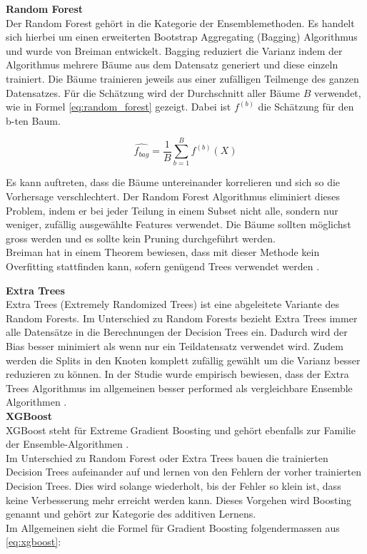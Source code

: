 \textbf{Random Forest}\\
Der Random Forest gehört in die Kategorie der Ensemblemethoden. Es handelt sich hierbei um einen erweiterten Bootstrap Aggregating (Bagging) Algorithmus und wurde von Breiman entwickelt. Bagging reduziert die Varianz indem der Algorithmus mehrere Bäume aus dem Datensatz generiert und diese einzeln trainiert.  Die Bäume trainieren jeweils aus einer zufälligen Teilmenge des ganzen Datensatzes. Für die Schätzung wird der Durchschnitt aller Bäume $B$ verwendet, wie in Formel \eqref{eq:random_forest} gezeigt. Dabei ist $f^{(b)}$ die Schätzung für den b-ten Baum.

\begin{equation}
\label{eq:random_forest}
\hat{f_{bag}} = \frac{1}{B} \sum_{b=1}^{B} f^{(b)} (X)
\end{equation}

Es kann auftreten, dass die Bäume untereinander korrelieren und sich so die Vorhersage verschlechtert. Der Random Forest Algorithmus eliminiert dieses Problem, indem er bei jeder Teilung in einem Subset nicht alle, sondern nur weniger, zufällig ausgewählte Features verwendet. Die Bäume sollten möglichst gross werden und es sollte kein Pruning durchgeführt werden.\\
Breiman hat in einem Theorem bewiesen, dass mit dieser Methode kein Overfitting stattfinden kann, sofern genügend Trees verwendet werden \cite{random_forest, random_forest_1}.

\textbf{Extra Trees}\\
Extra Trees (Extremely Randomized Trees) ist eine abgeleitete Variante des Random Forests. Im Unterschied zu Random Forests bezieht Extra Trees immer alle Datensätze in die Berechnungen der Decision Trees ein. Dadurch wird der Bias besser minimiert als wenn nur ein Teildatensatz verwendet wird. Zudem werden die Splits in den Knoten komplett zufällig gewählt um die Varianz besser reduzieren zu können. In der Studie wurde empirisch bewiesen, dass der Extra Trees Algorithmus im allgemeinen besser performed als vergleichbare Ensemble Algorithmen \cite{extrem_forest}.\\[2ex]
%
\textbf{XGBoost}\\
XGBoost steht für Extreme Gradient Boosting und gehört ebenfalls zur Familie der Ensemble-Algorithmen \cite{xgboost}.\\
Im Unterschied zu Random Forest oder Extra Trees bauen die trainierten Decision Trees aufeinander auf und lernen von den Fehlern der vorher trainierten Decision Trees. Dies wird solange wiederholt, bis der Fehler so klein ist, dass keine Verbesserung mehr erreicht werden kann. Dieses Vorgehen wird Boosting genannt und gehört zur Kategorie des additiven Lernens.\\
Im Allgemeinen sieht die Formel für Gradient Boosting folgendermassen aus \eqref{eq:xgboost}:

